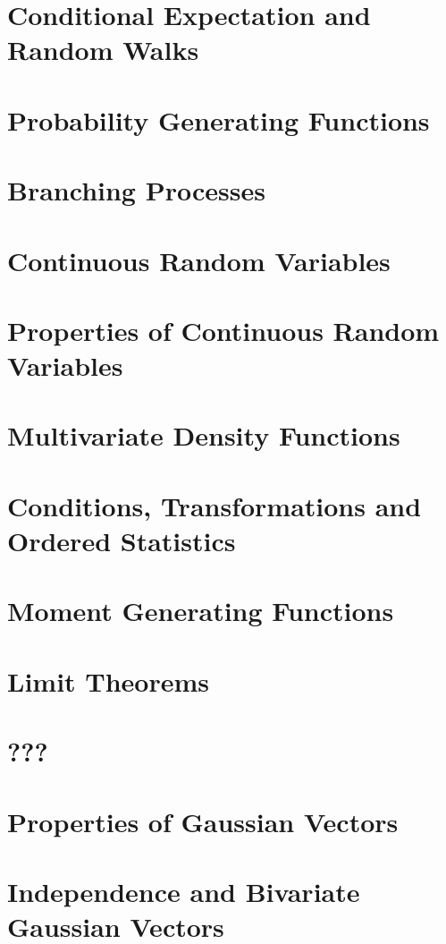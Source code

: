 \documentclass{article}
\begin{document}
\section{Conditional Expectation and Random Walks}

\section{Probability Generating Functions}

\section{Branching Processes}

\section{Continuous Random Variables}

\section{Properties of Continuous Random Variables}

\section{Multivariate Density Functions}

\section{Conditions, Transformations and Ordered Statistics}

\section{Moment Generating Functions}

\section{Limit Theorems}

\section{???}

\section{Properties of Gaussian Vectors}

\section{Independence and Bivariate Gaussian Vectors}

\end{document}
